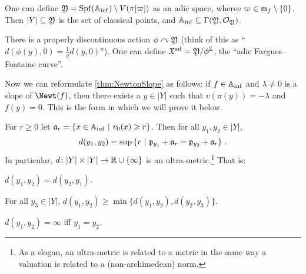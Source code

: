 \documentclass[a4paper, 10pt, oneside, DIV=9, chapterprefix=true, numbers=enddot,bibliography=totoc]{scrbook}
\begin{document}
\begin{rem}\label{rem:Y}
	\begin{numerate}
		\item One can define $\mathfrak{Y}=\operatorname{Spf}(\mathbb{A}_{\mathrm{inf}})\setminus V(\pi[\varpi])$ as an adic space, wheree $\varpi\in\mathfrak{m}_f\setminus\{0\}$. Then $|Y|\subseteq \mathfrak{Y}$ is the set of classical points, and $\mathbb{A}_{\mathrm{inf}}\subseteq \operatorname{\Gamma}(\mathfrak{Y},\mathcal{O}_{\mathfrak{Y}})$.
		\item There is a properly discontinuous action $\phi\curvearrowright\YY$ (think of this as \enquote{$d(\phi(y),0)=\frac1qd(y,0)$}). One can define $\XX^{\mathrm{ad}}=\YY/\phi^\IZ$, the \enquote{adic Fargues--Fontaine curve}.
	\end{numerate}
\end{rem}
Now we can reformulate \cref{thm:NewtonSlope} as follows: if $f\in\mathbb{A}_{\mathrm{inf}}$ and $\lambda\neq 0$ is a slope of $\Newt(f)$, then there exists a $y\in |Y|$ such that $v(\pi(y))=-\lambda$ and $f(y)=0$. This is the form in which we will prove it below.
\begin{lem}\label{lem:d}
	For $r\geq 0$ let $\mathfrak{a}_r=\left\{x\in\mathbb{A}_{\mathrm{inf}}\ \middle|\  v_0(x)\geqslant r\right\}$. Then for all $y_1,y_2\in|Y|$,
	\begin{equation*}
		d(y_1,y_2)=\sup\left\{r\ \middle|\  \mathfrak{p}_{y_1}+\mathfrak{a}_r=\mathfrak{p}_{y_2}+\mathfrak{a}_r\right\}\,.
	\end{equation*}
	In particular, $d\colon |Y|\times|Y|\morphism \IR\cup\{\infty\}$ is an ultra-metric.\footnote{As a slogan, an ultra-metric is related to a metric in the same way a valuation is related to a (non-archimedean) norm.} That is:
	\begin{numerate}
		\item $d(y_1,y_2)=d(y_2,y_1)$.
		\item For all $y_3\in|Y|$, $d(y_1,y_2)\geq \min\{d(y_1,y_2),d(y_2,y_3)\}$.
		\item $d(y_1,y_2)=\infty$ iff $y_1=y_2$.
	\end{numerate}
\end{lem}
\end{document}
